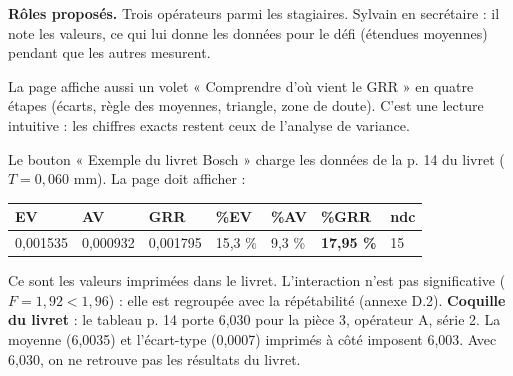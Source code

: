 \documentclass[10pt,a4paper]{article}
\begin{document}
\textbf{Rôles proposés.} Trois opérateurs parmi les stagiaires. Sylvain en secrétaire : il note les valeurs, ce qui lui donne les données pour le défi (étendues moyennes) pendant que les autres mesurent.

{\small La page affiche aussi un volet « Comprendre d'où vient le GRR » en quatre étapes (écarts, règle des moyennes, triangle, zone de doute). C'est une lecture intuitive : les chiffres exacts restent ceux de l'analyse de variance.}\par
Le bouton « Exemple du livret Bosch » charge les données de la p. 14 du livret ($T = 0{,}060$ mm). La page doit afficher :
\begin{center}
\begin{tabular}{@{}lllllll@{}}
\toprule
EV & AV & GRR & \%EV & \%AV & \%GRR & ndc\\\midrule
0,001535 & 0,000932 & 0,001795 & 15,3 \% & 9,3 \% & \textbf{17,95 \%} & 15\\
\bottomrule
\end{tabular}
\end{center}
Ce sont les valeurs imprimées dans le livret. L'interaction n'est pas significative ($F = 1{,}92 < 1{,}96$) : elle est regroupée avec la répétabilité (annexe D.2).
{\small \textbf{Coquille du livret} : le tableau p. 14 porte 6,030 pour la pièce 3, opérateur A, série 2. La moyenne (6,0035) et l'écart-type (0,0007) imprimés à côté imposent 6,003. Avec 6,030, on ne retrouve pas les résultats du livret.}
\end{document}
